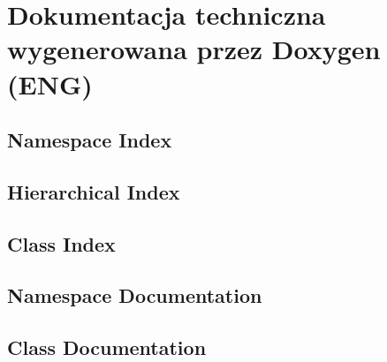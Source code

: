 \chapter{Dokumentacja techniczna wygenerowana przez Doxygen (ENG)}
\thispagestyle{chapterBeginStyle}

\section{Namespace Index}

\clearpage
\section{Hierarchical Index}

\clearpage
\section{Class Index}

\clearpage
\section{Namespace Documentation}







\clearpage
\section{Class Documentation}
























